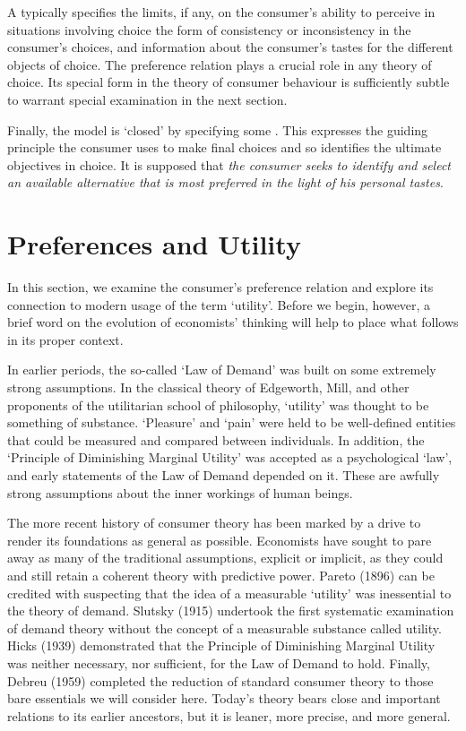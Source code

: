 \documentclass[b5paper]{memoir}
\begin{document}
A  typically specifies the limits, if any, on the consumer’s
ability to perceive in situations involving choice the form of consistency or
inconsistency in the consumer’s choices, and information about the consumer’s tastes for
the different objects of choice. The preference relation plays a crucial role in any
theory of choice. Its special form in the theory of consumer behaviour is sufficiently
subtle to warrant special examination in the next section.

Finally, the model is ‘closed’ by specifying some . This
expresses the guiding principle the consumer uses to make final choices and so identifies
the ultimate objectives in choice. It is supposed that \emph{the consumer seeks to
identify and select an available alternative that is most preferred in the light of his
personal tastes}.


\section{Preferences and Utility}

In this section, we examine the consumer’s preference relation and explore its connection
to modern usage of the term ‘utility’. Before we begin, however, a brief word on the
evolution of economists’ thinking will help to place what follows in its proper context.

In earlier periods, the so-called ‘Law of Demand’ was built on some extremely strong
assumptions. In the classical theory of Edgeworth, Mill, and other proponents of the
utilitarian school of philosophy, ‘utility’ was thought to be something of substance.
‘Pleasure’ and ‘pain’ were held to be well-defined entities that could be measured and
compared between individuals. In addition, the ‘Principle of Diminishing Marginal Utility’
was accepted as a psychological ‘law’, and early statements of the Law of Demand depended
on it. These are awfully strong assumptions about the inner workings of human beings.

The more recent history of consumer theory has been marked by a drive to render its
foundations as general as possible. Economists have sought to pare away as many of the
traditional assumptions, explicit or implicit, as they could and still retain a coherent
theory with predictive power. Pareto (1896) can be credited with suspecting that the idea
of a measurable ‘utility’ was inessential to the theory of demand. Slutsky (1915)
undertook the first systematic examination of demand theory without the concept of a
measurable substance called utility. Hicks (1939) demonstrated that the Principle of
Diminishing Marginal Utility was neither necessary, nor sufficient, for the Law of Demand
to hold. Finally, Debreu (1959) completed the reduction of standard consumer theory to
those bare essentials we will consider here. Today’s theory bears close and important
relations to its earlier ancestors, but it is leaner, more precise, and more general.
\end{document}
